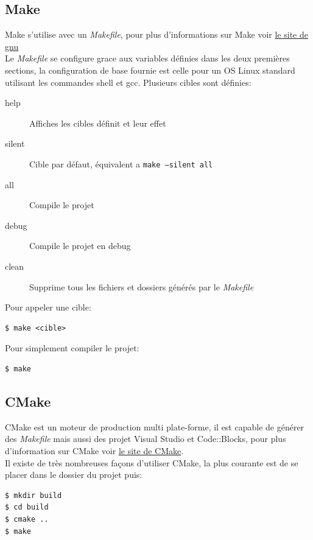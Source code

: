 \documentclass[article, backcover, french, nodocumentinfo]{upmethodology-document}
\begin{document}
		\subsection{Make}
			Make s'utilise avec un \textit{Makefile}, pour plus d'informations sur Make voir \href{https://www.gnu.org/software/make/}{le site de gnu}\\
			Le \textit{Makefile} se configure grace aux variables définies dans les deux premières sections, la configuration de base fournie est celle pour un OS Linux standard utilisant les commandes shell et gcc.
				Plusieurs cibles sont définies:
				\begin{description}
					\item[help] Affiches les cibles définit et leur effet
					\item[silent] Cible par défaut, équivalent a \texttt{make --silent all}
					\item[all] Compile le projet
					\item[debug] Compile le projet en debug
					\item[clean] Supprime tous les fichiers et dossiers générés par le \textit{Makefile}
				\end{description}
				Pour appeler une cible:
				\begin{lstlisting}[breaklines=true,breakatwhitespace=true,breakindent=0pt,columns=fixed,keepspaces=true,frame=single,basicstyle=\footnotesize\sffamily]
$ make <cible>\end{lstlisting}
				Pour simplement compiler le projet:
				\begin{lstlisting}[breaklines=true,breakatwhitespace=true,breakindent=0pt,columns=fixed,keepspaces=true,frame=single,basicstyle=\footnotesize\sffamily]
$ make\end{lstlisting}
		\subsection{CMake}
			CMake est un moteur de production multi plate-forme, il est capable de générer des \textit{Makefile} mais aussi des projet Visual Studio et Code::Blocks, pour plus d'information sur CMake voir \href{https://cmake.org/}{le site de CMake}.\\
				Il existe de très nombreuses façons d'utiliser CMake, la plus courante est de se placer dans le dossier du projet puis:
				\begin{lstlisting}[breaklines=true,breakatwhitespace=true,breakindent=0pt,columns=fixed,keepspaces=true,frame=single,basicstyle=\footnotesize\sffamily]
$ mkdir build
$ cd build
$ cmake ..
$ make \end{lstlisting}
\end{document}
